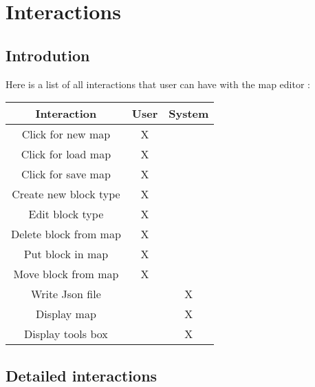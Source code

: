 \newpage
\thispagestyle{empty}
\chapter{Interactions}

\section{Introdution}

Here is a list of all interactions that user can have with the map editor :

\begin{center}
	\begin{tabular}{| c | c | c |}
			\hline \rowcolor{LightGrey} Interaction & User & System \\
			\hline Click for new map & X &  \\
			\hline Click for load map & X &  \\
			\hline Click for save map & X &  \\
			\hline Create new block type & X &  \\
			\hline Edit block type & X &  \\
			\hline Delete block from map & X &  \\
			\hline Put block in map & X &  \\
			\hline Move block from map & X &  \\
			\hline Write Json file & & X \\
			\hline Display map & & X \\
			\hline Display tools box & & X \\
			\hline
	\end{tabular}
\end{center}

\section{Detailed interactions}
